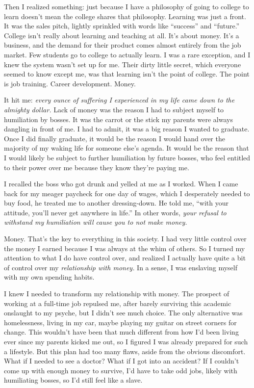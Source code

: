 Then I realized something: just because I have a philosophy of going to college to learn doesn't mean the college shares that philosophy. Learning was just a front. It was the sales pitch, lightly sprinkled with words like ``success'' and ``future.'' College isn't really about learning and teaching at all. It's about money. It's a business, and the demand for their product comes almost entirely from the job market. Few students go to college to actually learn. I was a rare exception, and I knew the system wasn't set up for me. Their dirty little secret, which everyone seemed to know except me, was that learning isn't the point of college. The point is job training. Career development. Money.

It hit me: \emph{every ounce of suffering I experienced in my life came down to the almighty dollar.} Lack of money was the reason I had to subject myself to humiliation by bosses. It was the carrot or the stick my parents were always dangling in front of me. I had to admit, it was a big reason I wanted to graduate. Once I did finally graduate, it would be the reason I would hand over the majority of my waking life for someone else's agenda. It would be the reason that I would likely be subject to further humiliation by future bosses, who feel entitled to their power over me because they know they're paying me.

I recalled the boss who got drunk and yelled at me as I worked. When I came back for my meager paycheck for one day of wages, which I desperately needed to buy food, he treated me to another dressing-down. He told me, ``with your attitude, you'll never get anywhere in life.'' In other words, \emph{your refusal to withstand my humiliation will cause you to not make money.}

Money. That's the key to everything in this society. I had very little control over the money I earned because I was always at the whim of others. So I turned my attention to what I do have control over, and realized I actually have quite a bit of control over my \emph{relationship with money.} In a sense, I was enslaving myself with my own spending habits.

I knew I needed to transform my relationship with money. The prospect of working at a full-time job repulsed me, after barely surviving this academic onslaught to my psyche, but I didn't see much choice. The only alternative was homelessness, living in my car, maybe playing my guitar on street corners for change. This wouldn't have been that much different from how I'd been living ever since my parents kicked me out, so I figured I was already prepared for such a lifestyle. But this plan had too many flaws, aside from the obvious discomfort. What if I needed to see a doctor? What if I got into an accident? If I couldn't come up with enough money to survive, I'd have to take odd jobs, likely with humiliating bosses, so I'd still feel like a slave.

